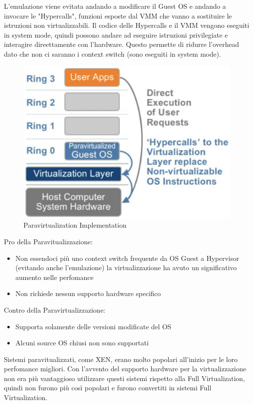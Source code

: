 \documentclass{article}
\begin{document}
L'emulazione viene evitata andando a modificare il Guest OS e andando a invocare le "Hypercalls", funzioni esposte dal VMM che vanno a sostituire le istruzioni non virtualizzabili. Il codice delle Hypercalls e il VMM vengono eseguiti in system mode, quindi possono andare ad eseguire istruzioni privilegiate e interagire direettamente con l'hardware. Questo permette di ridurre l'overhead dato che non ci saranno i context switch (sono eseguiti in system mode).
\begin{figure}[H]
    \centering
    \includegraphics[scale=0.3]{img/Virt_tech/18.png}
    \caption{Paravirtualization Implementation}
\end{figure}\noindent
Pro della Paravitualizzazione:
\begin{itemize}
    \item Non essendoci più uno context switch frequente da OS Guest a Hypervisor (evitando anche l'emulazione) la virtualizzazione ha avuto un significativo aumento nelle perfomance
    \item Non richiede nessun supporto hardware specifico
\end{itemize}
Contro della Paravirtualizzazione:
\begin{itemize}
    \item Supporta solamente delle versioni modificate del OS
    \item Alcuni source OS chiusi non sono supportati
\end{itemize}
Sistemi paravitualizzati, come XEN, erano molto popolari all'inizio per le loro perfomance migliori. Con l'avvento del supporto hardware per la virtualizzazione non era più vantaggioso utilizzare questi sistemi rispetto alla Full Virtualization, quindi non furono più così popolari e furono convertiti in sistemi Full Virtualization.\\ \\
\end{document}
